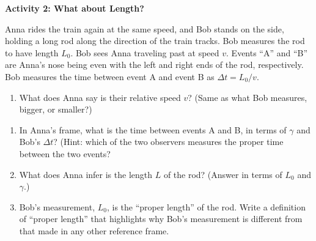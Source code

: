 \textbf{Activity 2: What about Length?}

Anna rides the train again at the same speed, and Bob stands on the side, holding a long rod along the direction of the train tracks.  Bob measures the rod to have length $L_0$.  Bob sees Anna traveling past at speed $v$.  Events ``A'' and ``B'' are Anna's nose being even with the left and right ends of the rod, respectively.  Bob measures the time between event A and event B as $\Delta t=L_0 / v$.  

\begin{enumerate}
\item What does Anna say is their relative speed $v$?  (Same as what Bob measures, bigger, or smaller?)
\answerspace{0.4in}
\end{enumerate}

\begin{enumerate}
\item In Anna's frame, what is the time between events A and B, in terms of $\gamma$ and Bob's $\Delta t$?  (Hint: which of the two observers measures the proper time between the two events?  
\answerspace{0.4in}

\item What does Anna infer is the length $L$ of the rod?  (Answer in terms of $L_0$ and $\gamma$.)
\answerspace{0.4in}

\item Bob's measurement, $L_0$, is the ``proper length'' of the rod.  Write a definition of ``proper length'' that highlights why Bob's measurement is different from that made in any other reference frame.
\answerspace{0.5in}
\end{enumerate}


